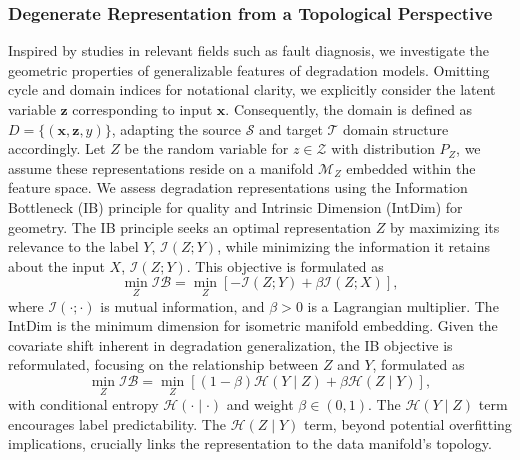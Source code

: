\documentclass[lettersize,journal]{IEEEtran}
\begin{document}
\subsubsection{Degenerate Representation from a Topological Perspective}

Inspired by studies in relevant fields such as fault diagnosis, we investigate the geometric properties of generalizable features of degradation models.
Omitting cycle and domain indices for notational clarity, we explicitly consider the latent variable $\boldsymbol{z}$ corresponding to input $\boldsymbol{x}$. Consequently, the domain is defined as $D = \{ (\boldsymbol{x}, \boldsymbol{z}, y) \}$, adapting the source $\mathcal{S}$ and target $\mathcal{T}$ domain structure accordingly.
Let $Z$ be the random variable for $z \in \mathcal{Z}$ with distribution $P_{Z}$, we assume these representations reside on a manifold $\mathcal{M}_{Z}$ embedded within the feature space.
We assess degradation representations using the Information Bottleneck (IB) \cite{alemi2017deep} principle for quality and Intrinsic Dimension (IntDim) \cite{10.5555/3692070.3694510} for geometry.
The IB principle seeks an optimal representation $Z$ by maximizing its relevance to the label $Y$, $\mathcal{I}(Z;Y)$, while minimizing the information it retains about the input $X$, $\mathcal{I}(Z;Y)$. This objective is formulated as
\begin{equation}
    \min_{Z} \mathcal{IB} = \min_{Z} [- \mathcal{I}(Z;Y) + \beta \mathcal{I}(Z;X)], 
    \label{IB_mutual_info}
\end{equation}
where $\mathcal{I}(\cdot;\cdot)$ is mutual information, and $\beta > 0$ is a Lagrangian multiplier. 
The IntDim is the minimum dimension for isometric manifold embedding.
Given the covariate shift inherent in degradation generalization, the IB objective is reformulated, focusing on the relationship between $Z$ and $Y$, formulated as
\begin{equation}
    \min_{Z} \mathcal{IB} = \min_{Z} [(1-\beta) \mathcal{H}(Y \mid Z) + \beta \mathcal{H}(Z \mid Y)], 
    \label{IB_cond_entropy}
\end{equation}
with conditional entropy $\mathcal{H}(\cdot \mid \cdot)$ and weight $\beta \in (0, 1)$.
The $\mathcal{H}(Y \mid Z)$ term encourages label predictability.
The $\mathcal{H}(Z \mid Y)$ term, beyond potential overfitting implications, crucially links the representation to the data manifold's topology.
\end{document}
